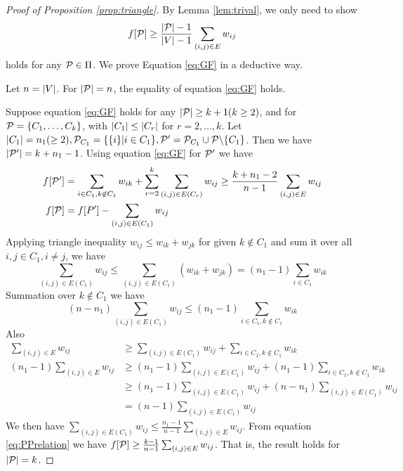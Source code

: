 \begin{proof}[Proof of Proposition \ref{prop:triangle}]
By Lemma \ref{lem:trival}, we only need to show
\begin{equation}\label{eq:GF}
f[\P] \geq \frac{\abs{\P}-1}{\abs{V}-1} \sum_{(i,j) \in E} w_{ij}
\end{equation}
holds for any $\P \in \Pi$. We prove Equation \ref{eq:GF} in a deductive way.

Let $n=\abs{V}$. For $\abs{\P}=n$, the equality of equation \ref{eq:GF} holds. 

Suppose equation \eqref{eq:GF} holds for any $\abs{\P} \geq k+1(k\geq 2)$, and for $\P=\{C_1, \dots, C_k\}$, with $\abs{C_1} \leq \abs{C_r}$ for $r=2,\dots, k$. Let $\abs{C_1}=n_1(\geq 2), \P_{C_1} = \{\{i\}| i \in C_1\}, \P'=\P_{C_1} \cup \P \backslash \{C_1\}$. Then we have $\abs{\P'} = k+n_1-1$. Using equation \eqref{eq:GF} for $\P'$ we have
\begin{align}\label{eq:PPrelation}
f[\P'] & = \sum_{i\in C_1, k \not\in C_1} w_{ik} + \sum_{r=2}^k \sum_{(i,j) \in E(C_r)} w_{ij}\geq \frac{k+n_1 -2}{n-1}\sum_{(i,j) \in E} w_{ij} \\
f[\P] & =f[P'] - \sum_{(i,j) \in E(C_1)} w_{ij}
\end{align}
Applying triangle inequality $w_{ij} \leq w_{ik} + w_{jk}$ for given $k\not\in C_1$ and sum it over all $i, j \in C_1, i\neq j$, we have
$$
\sum_{(i,j) \in E(C_1)} w_{ij} \leq \sum_{(i,j) \in E(C_1)} (w_{ik} + w_{jk}) = (n_1-1)\sum_{i\in C_1} w_{ik}
$$
Summation over $k \not\in C_1$ we have 
$$
(n - n_1) \sum_{(i,j) \in E(C_1)} w_{ij} \leq (n_1 - 1) \sum_{i \in C_1, k \not\in C_1} w_{ik}
$$
Also
\begin{align*}
\sum_{(i,j) \in E} w_{ij}  & \geq \sum_{(i,j) \in E(C_1)} w_{ij} + \sum_{i\in C_1, k\not\in C_1} w_{ik} \\
(n_1 - 1)\sum_{(i,j) \in E} w_{ij}  & \geq (n_1 -1 )\sum_{(i,j) \in E(C_1)} w_{ij} + (n_1-1)\sum_{i\in C_1, k\not\in C_1} w_{ik} \\
& \geq (n_1 -1 )\sum_{(i,j) \in E(C_1)} w_{ij} + (n - n_1) \sum_{(i,j) \in E(C_1)} w_{ij}\\
& = (n-1) \sum_{(i,j) \in E(C_1)} w_{ij}
\end{align*}
We then have $\sum_{(i,j) \in E(C_1)} w_{ij} \leq \frac{n_1-1}{n-1}\sum_{(i,j) \in E} w_{ij}$. From equation \eqref{eq:PPrelation} we have 
$f[\P] \geq \frac{k-1}{n-1}\sum_{(i,j) \in E} w_{ij}$. That is, the result holds for $\abs{\P}=k$.
\end{proof}
